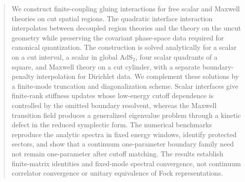 \begin{abstract}
We construct finite-coupling gluing interactions for free scalar and Maxwell theories on cut spatial regions. The quadratic interface interaction interpolates between decoupled region theories and the theory on the uncut geometry while preserving the covariant phase-space data required for canonical quantization. The construction is solved analytically for a scalar on a cut interval, a scalar in global $\mathrm{AdS}_2$, four scalar quadrants of a square, and Maxwell theory on a cut cylinder, with a separate boundary-penalty interpolation for Dirichlet data. We complement these solutions by a finite-mode truncation and diagonalization scheme. Scalar interfaces give finite-rank stiffness updates whose low-energy cutoff dependence is controlled by the omitted boundary resolvent, whereas the Maxwell transition field produces a generalized eigenvalue problem through a kinetic defect in the reduced symplectic form. The numerical benchmarks reproduce the analytic spectra in fixed energy windows, identify protected sectors, and show that a continuum one-parameter boundary family need not remain one-parameter after cutoff matching. The results establish finite-matrix identities and fixed-mode spectral convergence, not continuum correlator convergence or unitary equivalence of Fock representations.
\end{abstract}
